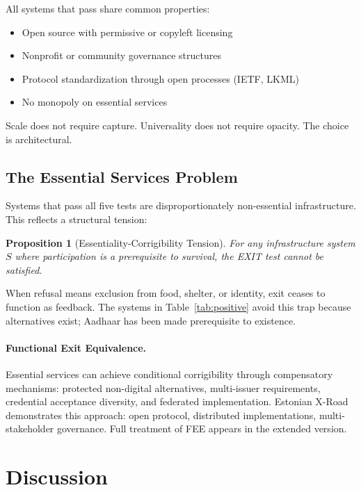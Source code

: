 \documentclass{article}
\newtheorem{proposition}{Proposition}
\begin{document}
All systems that pass share common properties:
\begin{itemize}
    \item Open source with permissive or copyleft licensing
    \item Nonprofit or community governance structures
    \item Protocol standardization through open processes (IETF, LKML)
    \item No monopoly on essential services
\end{itemize}

Scale does not require capture. Universality does not require opacity. The choice is architectural.

\subsection{The Essential Services Problem}
\label{subsec:essential}

Systems that pass all five tests are disproportionately non-essential infrastructure. This reflects a structural tension:

\begin{proposition}[Essentiality-Corrigibility Tension]
\label{prop:essentiality}
For any infrastructure system $S$ where participation is a prerequisite to survival, the EXIT test cannot be satisfied.
\end{proposition}

When refusal means exclusion from food, shelter, or identity, exit ceases to function as feedback. The systems in Table~\ref{tab:positive} avoid this trap because alternatives exist; Aadhaar has been made prerequisite to existence.

\paragraph{Functional Exit Equivalence.} Essential services can achieve conditional corrigibility through compensatory mechanisms: protected non-digital alternatives, multi-issuer requirements, credential acceptance diversity, and federated implementation. Estonian X-Road demonstrates this approach: open protocol, distributed implementations, multi-stakeholder governance. Full treatment of FEE appears in the extended version.

\section{Discussion}
\label{sec:discussion}
\end{document}
